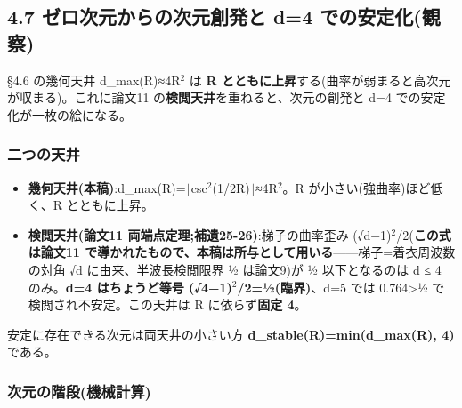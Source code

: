 \documentclass[
]{ltjsarticle}
\providecommand{\tightlist}{%
  \setlength{\itemsep}{0pt}\setlength{\parskip}{0pt}}
\begin{document}
\subsection{4.7 ゼロ次元からの次元創発と d=4
での安定化(観察)}\label{ux30bcux30edux6b21ux5143ux304bux3089ux306eux6b21ux5143ux5275ux767aux3068-d4-ux3067ux306eux5b89ux5b9aux5316ux89b3ux5bdf}

§4.6 の幾何天井 d\_max(R)≈4R\(^{2}\) は \textbf{R
とともに上昇}する(曲率が弱まると高次元が収まる)。これに論文11
の\textbf{検閲天井}を重ねると、次元の創発と d=4
での安定化が一枚の絵になる。

\subsubsection{二つの天井}\label{ux4e8cux3064ux306eux5929ux4e95}

\begin{itemize}
\tightlist
\item
  \textbf{幾何天井(本稿)}:d\_max(R)=\(\lfloor\)csc\(^{2}\)(1/2R)\(\rfloor\)≈4R\(^{2}\)。R
  が小さい(強曲率)ほど低く、R とともに上昇。
\item
  \textbf{検閲天井(論文11 両端点定理;補遺25-26)}:梯子の曲率歪み
  (√d−1)\(^{2}\)/2(\textbf{この式は論文11
  で導かれたもので、本稿は所与として用いる}------梯子=着衣周波数の対角
  √d に由来、半波長検閲限界 ½ は論文9)が ½ 以下となるのは d ≤ 4
  のみ。\textbf{d=4 はちょうど等号 (√4−1)\(^{2}\)/2=½(臨界)}、d=5 では
  0.764\textgreater½ で検閲され不安定。この天井は R に依らず\textbf{固定
  4}。
\end{itemize}

安定に存在できる次元は両天井の小さい方
\textbf{d\_stable(R)=min(d\_max(R), 4)} である。

\subsubsection{次元の階段(機械計算)}\label{ux6b21ux5143ux306eux968eux6bb5ux6a5fux68b0ux8a08ux7b97}
\end{document}
